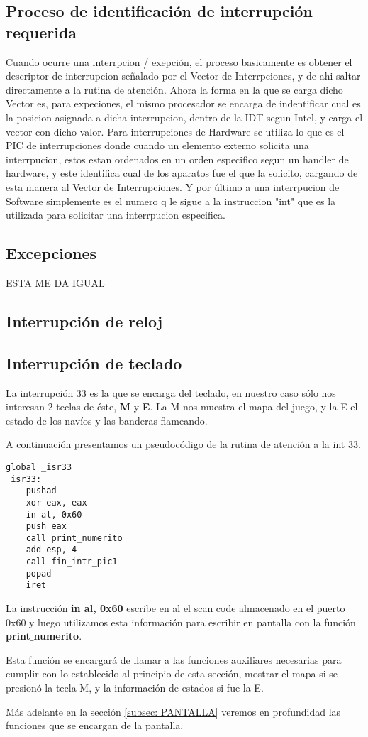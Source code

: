 \subsection{Proceso de identificación de interrupción requerida}
\par{Cuando ocurre una interrpcion / exepción, el proceso basicamente es obtener el descriptor de interrupcion señalado por el Vector de Interrpciones, y de ahi saltar directamente a la rutina de atención. Ahora la forma en la que se carga dicho Vector es, para expeciones, el mismo procesador se encarga de indentificar cual es la posicion asignada a dicha interrupcion, dentro de la IDT segun Intel, y carga el vector con dicho valor.  Para interrupciones de Hardware se utiliza lo que es el PIC de interrupciones donde cuando un elemento externo solicita una interrpucion, estos estan ordenados en un orden especifico segun un handler de hardware, y este identifica cual de los aparatos fue el que la solicito, cargando de esta manera al Vector de Interrupciones. Y por último a una interrpucion de Software simplemente es el numero q le sigue a la instruccion "int" que es la utilizada para solicitar una interrpucion especifica.}

\subsection{Excepciones}
\par{ESTA ME DA IGUAL}
\subsection{Interrupción de reloj}
\subsection{Interrupción de teclado}
\par{La interrupción 33 es la que se encarga del teclado, en nuestro caso sólo nos interesan 2 teclas de éste, \textbf{M} y \textbf{E}. La M nos muestra el mapa del juego, y la E el estado de los navíos y las banderas flameando.}
\par{A continuación presentamos un pseudocódigo de la rutina de atención a la int 33.}
\begin{lstlisting}[language={[x86masm]Assembler}]
global _isr33
_isr33:
    pushad
    xor eax, eax
    in al, 0x60
    push eax
    call print_numerito
    add esp, 4
    call fin_intr_pic1
    popad
    iret
\end{lstlisting}
\par{La instrucción \textbf{in al, 0x60} escribe en al el scan code almacenado en el puerto 0x60 y luego utilizamos esta información para escribir en pantalla con la función \textbf{print$\_$numerito}.}
\par{Esta función se encargará de llamar a las funciones auxiliares necesarias para cumplir con lo establecido al principio de esta sección, mostrar el mapa si se presionó la tecla M, y la información de estados si fue la E.}
\par{Más adelante en la sección \ref{subsec: PANTALLA} veremos en profundidad las funciones que se encargan de la pantalla.}

